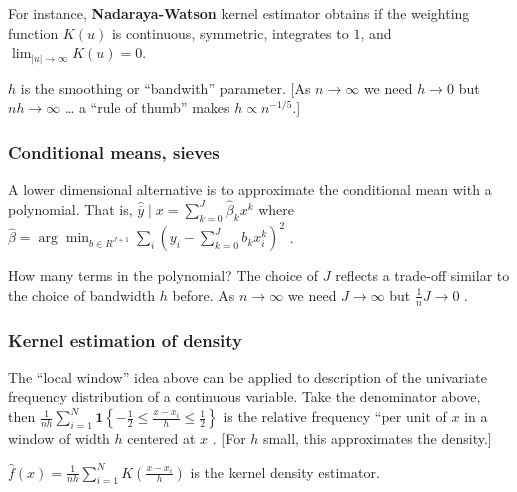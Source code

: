 For instance, \textbf{Nadaraya-Watson} kernel estimator obtains if the weighting function $K(u)$ is continuous, symmetric, integrates to $1$, and $\lim_{|u| \to \infty} K(u) = 0$.

\(h\) is the smoothing or ``bandwith'' parameter. [As \(n \to \infty\) we need \(h \to 0\) but \(nh \to \infty\) \ldots{} a ``rule of thumb'' makes \(h \propto n^{-1/5}\).]

\subsubsection{Conditional means, sieves} A lower dimensional alternative is to approximate the conditional mean with a polynomial. That is,
\(\widehat{\overline{y}}\mid x = \sum_{k = 0}^{J}\widehat{\beta}_{k}x^{k}\)
where
\(\widehat{\beta} = \arg \min_{b\in R^{J + 1}}\sum_{i}(y_{i} - \sum_{k = 0}^{J}b_{k}x_{i}^{k})^{2}\)
.

How many terms in the polynomial? The choice of \(J\) reflects a
trade-off similar to the choice of bandwidth \(h\) before. As
\(n \to \infty\) we need \(J \to \infty\) but \(\frac{1}{n} J \to 0\) .

\subsubsection{Kernel estimation of density} The ``local window'' idea above can be
applied to description of the univariate frequency distribution of a
continuous variable. Take the denominator above, then
\(\frac{1}{nh}\sum_{i=1}^{N}\mathbf{1}\left\{-\frac{1}{2} \leq \frac{x - x_i}{h} \leq \frac{1}{2}\right\}\)
is the relative frequency ``per unit of \(x\) in a window of width \(h\)
centered at \(x\) . {[}For \(h\) small, this approximates the
density.{]}

\(\widehat{f} (x) = \frac{1}{nh}\sum_{i = 1}^{N}K\left(\frac{x - x_i}{h}\right)\) is the kernel density estimator.

